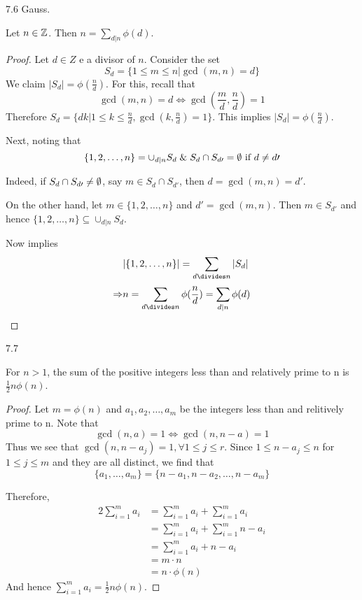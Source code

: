\begin{theorem}
    7.6 Gauss.

    Let $n \in \mathbb{Z}$. Then $n = \sum_{d | n}^{}\phi(d)$.
\end{theorem}
\begin{proof}
    Let $d \in Z$ e a divisor of $n$. Consider the set
    \[
        S_d = \{ 1 \leq m \leq n | \gcd(m, n) = d \}
    \]
    We claim $|S_d| = \phi(\frac{n}{d})$. For this, recall that
    \[
        \gcd(m, n) = d \iff \gcd(\frac{m}{d}, \frac{n}{d}) = 1
    \]
    Therefore $S_d = \{ dk | 1 \leq k \leq \frac{n}{d}, \gcd(k, \frac{n}{d}) = 1 \}$.\newline
    This implies $|S_d| = \phi(\frac{n}{d})$.

    Next, noting that
    \[
        \{ 1, 2, \dots, n \} = \cup_{d | n} S_d {\And} S_d \cap S_{d\prime} = \O \text{ if } d\neq d\prime
    \]

    Indeed, if $S_d \cap S_{d\prime} \neq \emptyset$, say $m \in S_d \cap S_{d\prime}$, then
    $d = \gcd(m, n) = d\prime$.

    On the other hand, let $m \in \{1, 2, \dots, n\}$ and $d\prime = \gcd(m, n)$.
    Then $m \in S_{d\prime}$ and hence $\{1, 2, \dots, n\} \subseteq \cup_{d | n}S_d$.

    Now implies
    \[
        \begin{aligned}
            &| \{ 1, 2, \dots, n \} | = \sum_{d \divides n}{ |S_d| } \\
            \Rightarrow &n = \sum_{d \divides n}^{}{\phi(\frac{n}{d})} = \sum_{d|n}^{}{\phi(d)}
        \end{aligned}
    \]
\end{proof}

\begin{theorem}
    7.7

    For $n > 1$, the sum of the positive integers less than 
    and relatively prime to n is $\frac{1}{2}n\phi(n)$.
\end{theorem}
\begin{proof}
    Let $m = \phi(n)$ and $a_1, a_2, \dots, a_m$ be the integers less than and relitively prime to n.
    Note that
    \[
        \gcd(n, a) = 1 \iff \gcd(n, n-a) = 1
    \]
    Thus we see that $\gcd(n, n-a_j) = 1, \forall 1 \leq j \leq r$.
    Since $1 \leq n-a_j \leq n$ for $1 \leq j \leq m$ and they are all distinct, we find that
    \[
        \{ a_1, \dots, a_m \} = \{ n-a_1, n-a_2, \dots, n-a_m \}
    \]

    Therefore,
    \[
        \begin{aligned}
            2\sum_{i=1}^{m}{a_i} &= \sum_{i=1}^{m}a_i + \sum_{i=1}^{m}a_i \\
            &= \sum_{i=1}^{m}a_i + \sum_{i=1}^{m}{n-a_i} \\
            &= \sum_{i=1}^{m}{a_i + n - a_i} \\
            &= m \cdot n \\
            &= n \cdot \phi(n)
        \end{aligned}
    \]
    And hence $\sum_{i=1}^{m}a_i = \frac{1}{2}n\phi(n)$.
\end{proof}

